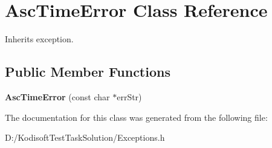 \hypertarget{class_asc_time_error}{\section{Asc\+Time\+Error Class Reference}
\label{class_asc_time_error}
}


Inherits exception.

\subsection*{Public Member Functions}
\begin{DoxyCompactItemize}
\item 
\hypertarget{class_asc_time_error_a06ad09ab45f8f7b167c313173658d312}{{\bfseries Asc\+Time\+Error} (const char $\ast$err\+Str)}\label{class_asc_time_error_a06ad09ab45f8f7b167c313173658d312}

\end{DoxyCompactItemize}


The documentation for this class was generated from the following file\+:\begin{DoxyCompactItemize}
\item 
D\+:/\+Kodisoft\+Test\+Task\+Solution/Exceptions.\+h\end{DoxyCompactItemize}

